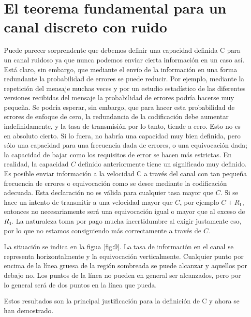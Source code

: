 \clearpage

\chapter{El teorema fundamental para un canal discreto con ruido}
\label{sec:13}

Puede parecer sorprendente que debemos definir una capacidad definida C para un canal ruidoso ya que nunca podemos enviar cierta información en un caso así. Está claro, sin embargo, que mediante el envío de la información en una forma redundante la probabilidad de errores se puede reducir. Por ejemplo, mediante la repetici\'{o}n del mensaje muchas veces y por un estudio estad\'{i}stico de las diferentes versiones recibidas del mensaje la probabilidad de errores podr\'{i}a hacerse muy peque\~{n}a. Se podr\'{i}a esperar, sin embargo, que para hacer esta probabilidad de errores de enfoque de cero, la redundancia de la codificaci\'{o}n debe aumentar indefinidamente, y la tasa de transmisi\'{o}n por lo tanto, tiende a cero. Esto no es en absoluto cierto. Si lo fuera, no habr\'{i}a una capacidad muy bien definida, pero s\'{o}lo una capacidad para una frecuencia dada de errores, o una equivocaci\'{o}n dada; la capacidad de bajar como los requisitos de error se hacen m\'{a}s estrictas. En realidad, la capacidad $C$ definido anteriormente tiene un significado muy definido. Es posible enviar informaci\'{o}n a la velocidad C a trav\'{e}s del canal con tan peque\~{n}a frecuencia de errores o equivocaci\'{o}n como se desee mediante la codificaci\'{o}n adecuada. Esta declaraci\'{o}n no es v\'{a}lida para cualquier tasa mayor que $C$. Si se hace un intento de transmitir a una velocidad mayor que $C$, por ejemplo $C + R_1$, entonces no necesariamente ser\'{a} una equivocaci\'{o}n igual o mayor que al exceso de $R_1$. La naturaleza toma por pago mucha incertidumbre al exigir justamente eso, por lo que no estamos consiguiendo m\'{a}s correctamente a trav\'{e}s de $C$.

La situaci\'{o}n se indica en la figua \ref{fig:9}. La tasa de informaci\'{o}n en el canal se representa horizontalmente y la equivocaci\'{o}n verticalmente. Cualquier punto por encima de la l\'{i}nea gruesa de la regi\'{o}n sombreada se puede alcanzar y aquellos por debajo no. Los puntos de la l\'{i}nea no pueden en general ser alcanzados, pero por lo general ser\'{a} de dos puntos en la l\'{i}nea que pueda.

Estos resultados son la principal justificaci\'{o}n para la definici\'{o}n de C y ahora se han demostrado.

